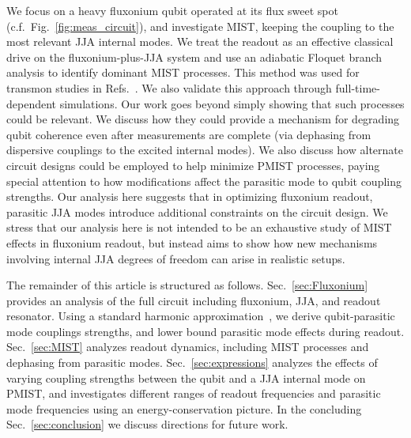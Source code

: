 \documentclass[%
reprint,
superscriptaddress,
 amsmath,amssymb,
 aps,
 prx,
longbibliography,
floatfix,
]{revtex4-2}
\begin{document}
We focus on a heavy fluxonium qubit operated at its flux sweet spot (c.f.~Fig.~\ref{fig:meas_circuit}), and investigate MIST, keeping the coupling to the most relevant JJA internal modes. We treat the readout as an effective classical drive on the fluxonium-plus-JJA system and use an adiabatic Floquet branch analysis to identify dominant MIST processes. This method was used for transmon studies in Refs.~\cite{cohen2023reminiscence,dumas2024unified}. We also validate this approach through full-time-dependent simulations.  
Our work goes beyond simply showing that such processes could be relevant.  We discuss how they could provide a mechanism for degrading qubit coherence even after measurements are complete (via dephasing from dispersive couplings to the excited internal modes).  We also discuss how alternate circuit designs could be employed to help minimize PMIST processes, paying special attention to how modifications affect the parasitic mode to qubit coupling strengths.  Our analysis here suggests that in optimizing fluxonium readout, parasitic JJA modes introduce additional constraints on the circuit design. We stress that our analysis here is not intended to be an exhaustive study of MIST effects in fluxonium readout, but instead aims to show how new mechanisms involving internal JJA degrees of freedom can arise in realistic setups.


The remainder of this article is structured as follows. Sec.~\ref{sec:Fluxonium}
provides an analysis of the full circuit including fluxonium, JJA, and readout resonator.  Using a standard harmonic approximation~\cite{viola2015collective}, we derive qubit-parasitic mode couplings strengths, and lower bound parasitic mode effects during readout. Sec.~\ref{sec:MIST} analyzes readout dynamics, including MIST processes and dephasing from parasitic modes. Sec.~\ref{sec:expressions} analyzes the effects of varying coupling strengths between the qubit and a JJA internal mode on PMIST, and investigates different ranges of readout frequencies and parasitic mode frequencies using an energy-conservation picture. In the concluding Sec.~\ref{sec:conclusion} we discuss directions for future work.
\end{document}
